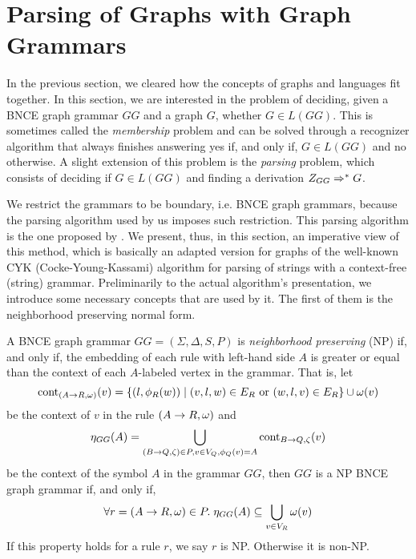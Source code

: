 \section{Parsing of Graphs with Graph Grammars}
\label{sec:parsing}
In the previous section, we cleared how the concepts of graphs and languages fit together. In this section, we are interested in the problem of deciding, given a BNCE graph grammar $GG$ and a graph $G$, whether $G \in L(GG)$. This is sometimes called the \textit{membership} problem and can be solved through a recognizer algorithm that always finishes answering yes if, and only if, $G \in L(GG)$ and no otherwise. A slight extension of this problem is the \textit{parsing} problem, which consists of deciding if $G \in L(GG)$ and finding a derivation $Z_{GG} \Rightarrow^*_{} G$.

We restrict the grammars to be boundary, i.e. BNCE graph grammars, because the parsing algorithm used by us imposes such restriction. This parsing algorithm is the one proposed by \citep{rozenberg1986boundary}. We present, thus, in this section, an imperative view of this method, which is basically an adapted version for graphs of the well-known CYK (Cocke-Young-Kassami) algorithm for parsing of strings with a context-free (string) grammar. Preliminarily to the actual algorithm's presentation, we introduce some necessary concepts that are used by it. The first of them is the neighborhood preserving normal form.

\begin{definition}
	\label{def:np}
	A BNCE graph grammar $GG = (\Sigma, \Delta, S, P)$ is \emph{neighborhood preserving} (NP) if, and only if, the embedding of each rule with left-hand side $A$ is greater or equal than the context of each $A$-labeled vertex in the grammar. That is, let 
	\begin{equation*}
		\operatorname{cont}_{(A \to R,\omega)}(v) =\{(l,\phi_{R}(w)) \; | \; (v,l,w) \in E_R \text { or } (w,l,v) \in E_R \} \cup \omega(v)
	\end{equation*}
	be the context of $v$ in the rule $(A \to R,\omega)$ and
	\begin{equation*}
		\eta_{GG}(A) = \bigcup_{(B \to Q,\zeta) \in P, v \in V_Q, \phi_Q(v) = A} \operatorname{cont}_{B \to Q,\zeta}(v)
	\end{equation*}
	be the context of the symbol $A$ in the grammar $GG$, then $GG$ is a NP BNCE graph grammar if, and only if,
	\begin{equation*}
		\forall r = (A \to R,\omega) \in P . \; \eta_{GG}(A) \subseteq \bigcup_{v \in V_R} \omega(v)
	\end{equation*}
	If this property holds for a rule $r$, we say $r$ is NP. Otherwise it is non-NP.
\end{definition}

